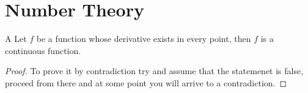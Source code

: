 \section{Number Theory}

\begin{theorem}{A}
    Let $f$ be a function whose derivative exists in every point, then $f$
    is a continuous function.
\end{theorem}

\begin{proof}
    To prove it by contradiction try and assume that the statemenet is false,
    proceed from there and at some point you will arrive to a contradiction.
\end{proof}
